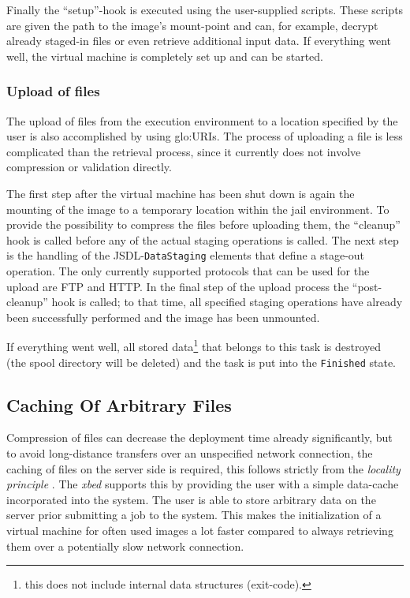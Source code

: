 Finally   the   ``setup''-hook  is   executed   using  the   user-supplied
scripts. These scripts  are given the path to  the image's mount-point and
can,  for  example,  decrypt  already  staged-in files  or  even  retrieve
additional input  data. If  everything went well,  the virtual  machine is
completely set up and can be started.

\subsubsection{Upload of files}

The upload of files from the execution environment to a location specified
by the user  is also accomplished by using  \gls{glo:URI}s. The process of
uploading a file is less  complicated than the retrieval process, since it
currently does  not involve compression or validation  directly.

The first step  after the virtual machine has been shut  down is again the
mounting of the image to a temporary location within the jail environment.
To provide  the possibility to  compress the files before  uploading them,
the ``cleanup'' hook is called before any of the actual staging operations
is called. The next step  is the handling of the JSDL-\texttt{DataStaging}
elements that  define a stage-out operation. The  only currently supported
protocols that can be  used for the upload are FTP and  HTTP. In the final
step of  the upload process the  ``post-cleanup'' hook is  called; to that
time,  all specified  staging  operations have  already been  successfully
performed and the image has been unmounted.

If everything  went well, all  stored data\footnote{this does  not include
  internal data structures (\eg exit-code).}  that belongs to this task is
destroyed (\ie  the spool directory will  be deleted) and the  task is put
into the \texttt{Finished} state.

\subsection{Caching Of Arbitrary Files}
\label{sec:caching}

Compression   of  files   can   decrease  the   deployment  time   already
significantly, but  to avoid  long-distance transfers over  an unspecified
network connection, the  caching of files on the  server side is required,
this    follows    strictly    from    the    \emph{locality    principle}
\cite{locality-principle}.  The \emph{xbed} supports this by providing the
user with a  simple data-cache incorporated into the  system.  The user is
able to store  arbitrary data on the server prior submitting  a job to the
system. This makes the initialization  of a virtual machine for often used
images a lot faster compared  to always retrieving them over a potentially
slow network connection.

